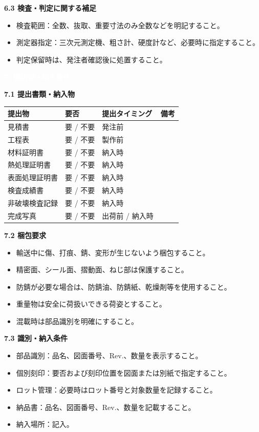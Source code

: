 \documentclass[a4paper,10pt]{ltjsarticle}
\makeatletter
\newlength{\SpecBodyWidth}
\newcommand{\PageTitle}[1]{%
  \vspace*{2mm}%
  \noindent\colorbox{SpecHead}{%
    \parbox{\dimexpr\SpecBodyWidth-2\fboxsep\relax}{%
      \large\bfseries\textcolor{white}{#1}%
    }%
  }%
  \par\vspace{5mm}%
}
\newcommand{\BlockTitle}[1]{%
  \vspace{4mm}%
  \noindent\colorbox{SpecSoft}{%
    \parbox{\dimexpr\SpecBodyWidth-2\fboxsep\relax}{%
      \normalsize\bfseries\textcolor{SpecHead}{#1}%
    }%
  }%
  \par\vspace{1.5mm}%
}
\newenvironment{SpecTable}[1]{%
  \par\vspace{1mm}%
  \noindent\footnotesize%
  \renewcommand{\arraystretch}{1.10}%
  \setlength{\tabcolsep}{3.0pt}%
  \begin{tabular*}{\SpecBodyWidth}{@{\extracolsep{\fill}}#1@{}}%
}{%
  \end{tabular*}%
  \par\vspace{1.5mm}%
}
\newcommand{\Head}[1]{\textbf{\textcolor{SpecHead}{#1}}}
\newcommand{\YN}{要 / 不要}
\makeatother
\begin{document}
\BlockTitle{6.3 検査・判定に関する補足}
\begin{itemize}
  \item 検査範囲：全数、抜取、重要寸法のみ全数などを明記すること。
  \item 測定器指定：三次元測定機、粗さ計、硬度計など、必要時に指定すること。
  \item 判定保留時は、発注者確認後に処置すること。
\end{itemize}

\clearpage

\PageTitle{7. 提出物・納入条件}

\BlockTitle{7.1 提出書類・納入物}
\begin{SpecTable}{|p{48mm}|p{22mm}|p{34mm}|p{42mm}|}
\hline
\Head{提出物} & \Head{要否} & \Head{提出タイミング} & \Head{備考} \\
\hline
見積書 & \YN & 発注前 &  \\
\hline
工程表 & \YN & 製作前 &  \\
\hline
材料証明書 & \YN & 納入時 &  \\
\hline
熱処理証明書 & \YN & 納入時 &  \\
\hline
表面処理証明書 & \YN & 納入時 &  \\
\hline
検査成績書 & \YN & 納入時 &  \\
\hline
非破壊検査記録 & \YN & 納入時 &  \\
\hline
完成写真 & \YN & 出荷前 / 納入時 &  \\
\hline
\end{SpecTable}

\BlockTitle{7.2 梱包要求}
\begin{itemize}
  \item 輸送中に傷、打痕、錆、変形が生じないよう梱包すること。
  \item 精密面、シール面、摺動面、ねじ部は保護すること。
  \item 防錆が必要な場合は、防錆油、防錆紙、乾燥剤等を使用すること。
  \item 重量物は安全に荷扱いできる荷姿とすること。
  \item 混載時は部品識別を明確にすること。
\end{itemize}

\BlockTitle{7.3 識別・納入条件}
\begin{itemize}
  \item 部品識別：品名、図面番号、Rev.、数量を表示すること。
  \item 個別刻印：要否および刻印位置を図面または別紙で指定すること。
  \item ロット管理：必要時はロット番号と対象数量を記録すること。
  \item 納品書：品名、図面番号、Rev.、数量を記載すること。
  \item 納入場所：記入。
\end{itemize}
\end{document}
